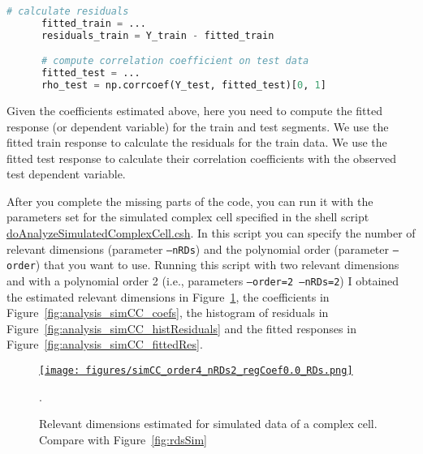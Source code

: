 \documentclass[12pt]{article}
\begin{document}
\begin{lstlisting}[language=python]
      # calculate residuals
      fitted_train = ...
      residuals_train = Y_train - fitted_train

      # compute correlation coefficient on test data
      fitted_test = ...
      rho_test = np.corrcoef(Y_test, fitted_test)[0, 1]
\end{lstlisting}

Given the coefficients estimated above, here you need to compute the fitted
response (or dependent variable) for the train and test segments. We use the
fitted train response to calculate the residuals for the train data. We use the
fitted test response to calculate their correlation coefficients with the
observed test dependent variable.

After you complete the missing parts of the code, you can run it with the
parameters set for the simulated complex cell specified in the shell script
\href{https://github.com/joacorapela/neuroinformatics24/blob/master/worksheets/06_linearRegression/code/scripts/doAnalyzeSimulatedComplexCell.csh}{doAnalyzeSimulatedComplexCell.csh}.
In this script you can specify the number of relevant dimensions (parameter
\texttt{--nRDs}) and the polynomial order (parameter \texttt{--order}) that you
want to use. Running this script with two relevant dimensions and with a
polynomial order 2 (i.e., parameters \texttt{--order=2 --nRDs=2}) I obtained the
estimated relevant dimensions in Figure~\ref{fig:analysis_simCC_rds}, the coefficients
in Figure~\ref{fig:analysis_simCC_coefs}, the histogram of residuals in
Figure~\ref{fig:analysis_simCC_histResiduals} and the fitted responses in
Figure~\ref{fig:analysis_simCC_fittedRes}.

\begin{figure}[H]
    \begin{center}
        \href{https://www.gatsby.ucl.ac.uk/~rapela/neuroinformatics/2023/ws6/figures/simCC_order4_nRDs2_regCoef0.0_RDs.html}{\texttt{[image: figures/simCC\_order4\_nRDs2\_regCoef0.0\_RDs.png]}}

        \caption{Relevant dimensions estimated for simulated data of a complex cell. Compare with Figure~\ref{fig:rdsSim}}.

        \label{fig:analysis_simCC_rds}
    \end{center}
\end{figure}
\end{document}
